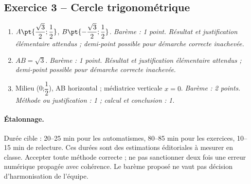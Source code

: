 \subsection*{Exercice 3 -- Cercle trigonométrique}
\begin{enumerate}
\item $A\pt{\dfrac{\sqrt 3}{2};\dfrac{1}{2}}$, $B\pt{-\dfrac{\sqrt 3}{2};\dfrac{1}{2}}$. \textit{Barème : 1 point. Résultat et justification élémentaire attendus ; demi-point possible pour démarche correcte inachevée.}
\item $AB=\sqrt3$. \textit{Barème : 1 point. Résultat et justification élémentaire attendus ; demi-point possible pour démarche correcte inachevée.}
\item Milieu (0;$\dfrac{1}{2}$), AB horizontal ; médiatrice verticale $x=0$. \textit{Barème : 2 points. Méthode ou justification : 1 ; calcul et conclusion : 1.}
\end{enumerate}
\paragraph{Étalonnage.} Durée cible : 20–25 min pour les automatismes, 80–85 min pour les exercices, 10–15 min de relecture. Ces durées sont des estimations éditoriales à mesurer en classe. Accepter toute méthode correcte ; ne pas sanctionner deux fois une erreur numérique propagée avec cohérence. Le barème proposé ne vaut pas décision d’harmonisation de l’équipe.
